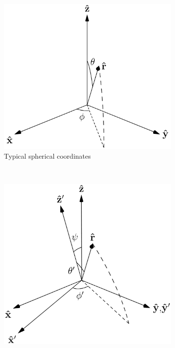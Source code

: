 \documentclass[11pt]{article}
\begin{document}
\begin{figure}[h]
 \captionsetup{width=1.0\linewidth}
 \centering
 \begin{subfigure}[t]{0.33\textwidth}
   \centering
   \includegraphics[width = 1.0\textwidth]{../figures/frame_a.pdf}
   \caption{Typical spherical coordinates}
   \label{fig:frames_a}
 \end{subfigure}%
 ~
 \begin{subfigure}[t]{0.33\textwidth}
   \centering
   \includegraphics[width = 1.0\textwidth]{../figures/frame_b.pdf}

\end{subfigure}
\end{figure}
\end{document}
